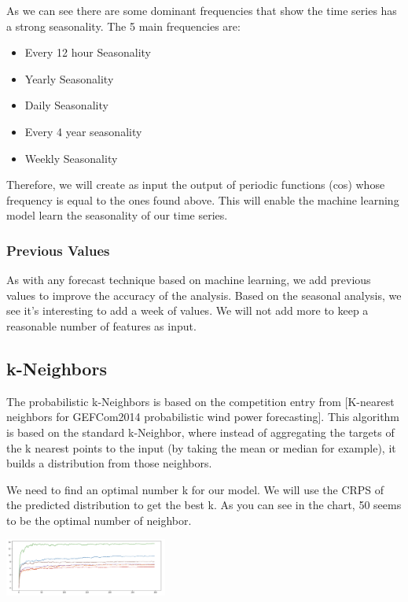 \documentclass[a4paper,twocolumn,5p]{elsarticle}
\begin{document}
As we can see there are some dominant frequencies that show the time series has a strong seasonality. The 5 main 
frequencies are:

\begin{itemize}
  \item Every 12 hour Seasonality
  \item Yearly Seasonality
  \item Daily Seasonality
  \item Every 4 year seasonality
  \item Weekly Seasonality
\end{itemize} 

Therefore, we will create as input the output of periodic functions (cos) whose frequency is equal to the ones found 
above. This will enable the machine learning model learn the seasonality of our time series.

\subsubsection{Previous Values}

As with any forecast technique based on machine learning, we add previous values to improve the accuracy 
of the analysis. Based on the seasonal analysis, we see it's interesting to add a week of values. We will not 
add more to keep a reasonable number of features as input.

\subsection{k-Neighbors}

The probabilistic k-Neighbors is based on the competition entry from 
[K-nearest neighbors for GEFCom2014 probabilistic wind power forecasting]. 
This algorithm is based on the standard k-Neighbor, where instead of aggregating the targets of the
k nearest points to the input (by taking the mean or median for example), it builds a distribution 
from those neighbors.

We need to find an optimal number k for our model. We will use the CRPS of the predicted distribution
to get the best k. As you can see in the chart, 50 seems to be the optimal 
number of neighbor.

\includegraphics[width=0.4\textwidth]{kneighbor_crps}
\end{document}
